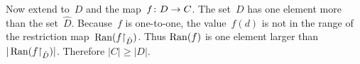 \documentclass{ibl}  %
\begin{document}
\begin{problem}
\begin{exes}
\begin{answer}
  Now extend to~$D$ and the map~$\mbox{$f\colon D\to C$}$.
  The set~$D$ has one element more than the set~$\hat{D}$.
  Because~$f$ is one-to-one, the value~$f(d)$ is not in 
  the range of the restriction map~$\operatorname{Ran}({f}\mathord\upharpoonright_{\hat{D}})$.
  Thus $\operatorname{Ran}(f)$ is one element larger than
  $|\operatorname{Ran}({f}\mathord\upharpoonright_{\hat{D}})|$.
  Therefore $|C|\geq|D|$.  
\end{answer}
\end{exes}




\end{problem}
\end{document}

